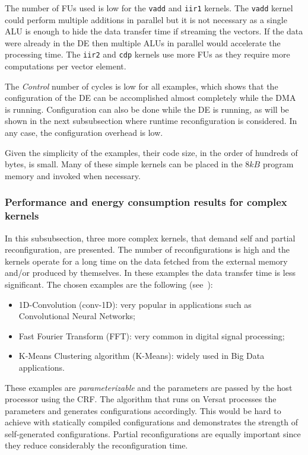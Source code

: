 \documentclass[journal]{IEEEtran}
\begin{document}
The number of FUs used is low for the {\tt vadd} and {\tt iir1}
kernels. The {\tt vadd} kernel could perform multiple additions in
parallel but it is not necessary as a single ALU is enough to hide the
data transfer time if streaming the vectors. If the data were already
in the DE then multiple ALUs in parallel would accelerate the
processing time. The {\tt iir2} and {\tt cdp} kernels use more FUs
as they require more computations per vector element.

The {\em Control} number of cycles is low for all examples, which
shows that the configuration of the DE can be accomplished almost
completely while the DMA is running. Configuration can also be done
while the DE is running, as will be shown in the next subsubsection where
runtime reconfiguration is considered. In any case, the configuration
overhead is low.

Given the simplicity of the examples, their code size, in the order of
hundreds of bytes, is small. Many of these simple kernels can be
placed in the $8kB$ program memory and invoked when necessary.

\subsubsection{Performance and energy consumption results for complex kernels}
\label{subsection:ResultsComplexKernels}

In this subsubsection, three more complex kernels, that demand self
and partial reconfiguration, are presented. The number of
reconfigurations is high and the kernels operate for a long time on
the data fetched from the external memory and/or produced by
themselves. In these examples the data transfer time is less
significant. The chosen examples are the following
(see~\cite{Lopes2017}):
\begin{itemize}
\item 1D-Convolution (conv-1D): very popular in applications such as
  Convolutional Neural Networks;
\item Fast Fourier Transform (FFT): very common in digital signal processing;
\item K-Means Clustering algorithm (K-Means): widely used in Big Data
  applications.
\end{itemize}

These examples are {\em parameterizable} and the parameters are passed
by the host processor using the CRF. The algorithm that runs on Versat
processes the parameters and generates configurations
accordingly. This would be hard to achieve with statically compiled
configurations and demonstrates the strength of self-generated
configurations. Partial reconfigurations are equally important
since they reduce considerably the reconfiguration time.
\end{document}
